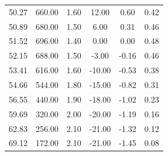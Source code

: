 \documentclass[11pt,twocolumn]{article}
\begin{document}
\begin{table}[H]
{\begin{tabular}{
        S[table-format=3.2]
        S[table-format=3.2]
        S[table-format=1.2]
        S[table-format=-2.2]
        S[table-format=-1.2]
        S[table-format=1.2]
      }
      50.27                                       & 660.00              & 1.60               & 12.00                               & 0.60                                       & 0.42                                     \\
      50.89                                       & 680.00              & 1.50               & 6.00                                & 0.31                                       & 0.46                                     \\
      51.52                                       & 696.00              & 1.40               & 0.00                                & 0.00                                       & 0.48                                     \\
      52.15                                       & 688.00              & 1.50               & -3.00                               & -0.16                                      & 0.46                                     \\
      53.41                                       & 616.00              & 1.60               & -10.00                              & -0.53                                      & 0.38                                     \\
      54.66                                       & 544.00              & 1.80               & -15.00                              & -0.82                                      & 0.31                                     \\
      56.55                                       & 440.00              & 1.90               & -18.00                              & -1.02                                      & 0.23                                     \\
      59.69                                       & 320.00              & 2.00               & -20.00                              & -1.19                                      & 0.16                                     \\
      62.83                                       & 256.00              & 2.10               & -21.00                              & -1.32                                      & 0.12                                     \\
      69.12                                       & 172.00              & 2.10               & -21.00                              & -1.45                                      & 0.08                                     \\

\end{tabular}}
\end{table}
\end{document}

